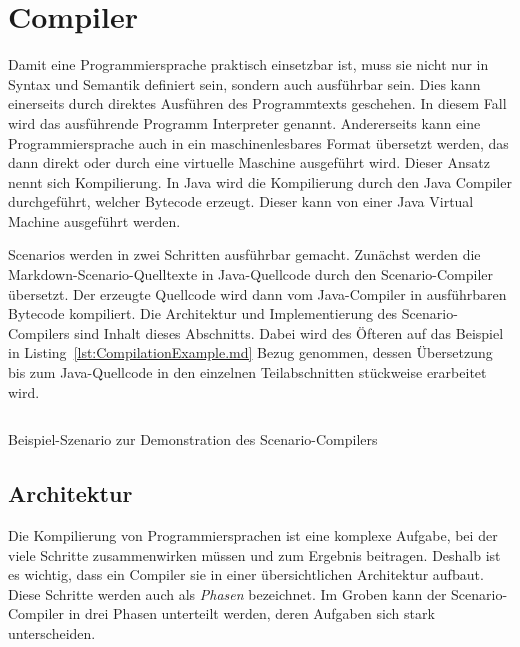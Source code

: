 \section{Compiler}\label{sec:compiler}

Damit eine Programmiersprache praktisch einsetzbar ist, muss sie nicht nur in Syntax und Semantik definiert sein, sondern auch ausführbar sein.
Dies kann einerseits durch direktes Ausführen des Programmtexts geschehen.
In diesem Fall wird das ausführende Programm Interpreter genannt.
Andererseits kann eine Programmiersprache auch in ein maschinenlesbares Format übersetzt werden, das dann direkt oder durch eine virtuelle Maschine ausgeführt wird.
Dieser Ansatz nennt sich Kompilierung.
In Java wird die Kompilierung durch den Java Compiler durchgeführt, welcher Bytecode erzeugt.
Dieser kann von einer Java Virtual Machine ausgeführt werden.

Scenarios werden in zwei Schritten ausführbar gemacht.
Zunächst werden die Markdown-Scenario-Quelltexte in Java-Quellcode durch den Scenario-Compiler übersetzt.
Der erzeugte Quellcode wird dann vom Java-Compiler in ausführbaren Bytecode kompiliert.
Die Architektur und Implementierung des Scenario-Compilers sind Inhalt dieses Abschnitts.
Dabei wird des Öfteren auf das Beispiel in Listing~\ref{lst:CompilationExample.md} Bezug genommen, dessen Übersetzung bis zum Java-Quellcode in den einzelnen Teilabschnitten stückweise erarbeitet wird.

\begin{listing}[htp]
    \centering
    \inputminted{md}{chapter/fulib-scenarios/scenarios/CompilationExample.md}
    \vspace{-3ex}
    \caption{Beispiel-Szenario zur Demonstration des Scenario-Compilers}
    \label{lst:CompilationExample.md}
\end{listing}

\subsection{Architektur}\label{subsec:compiler-architecture}

Die Kompilierung von Programmiersprachen ist eine komplexe Aufgabe, bei der viele Schritte zusammenwirken müssen und zum Ergebnis beitragen.
Deshalb ist es wichtig, dass ein Compiler sie in einer übersichtlichen Architektur aufbaut.
Diese Schritte werden auch als \emph{Phasen}\cite[S.~4]{dragonbook} bezeichnet.
Im Groben kann der Scenario-Compiler in drei Phasen unterteilt werden, deren Aufgaben sich stark unterscheiden.

